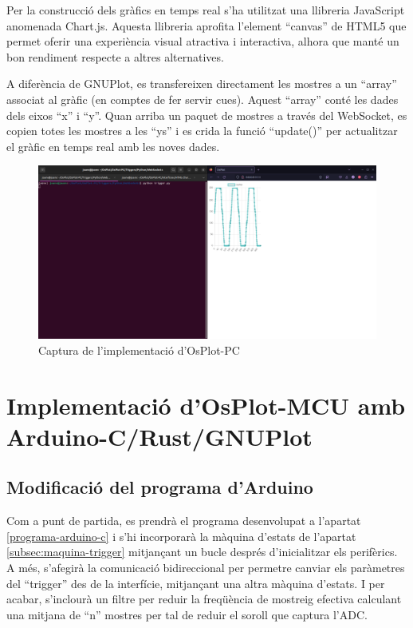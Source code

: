 \documentclass{tfgitic}[2023/06/30]
\begin{document}
Per la construcció dels gràfics en temps real s'ha utilitzat una
llibreria JavaScript anomenada Chart.js. Aquesta llibreria aprofita
l'element ``canvas'' de HTML5 que permet oferir una experiència visual
atractiva i interactiva, alhora que manté un bon rendiment respecte a
altres alternatives.

A diferència de GNUPlot, es transfereixen directament les mostres a un
``array'' associat al gràfic (en comptes de fer servir cues). Aquest
``array'' conté les dades dels eixos ``x'' i ``y''. Quan arriba un
paquet de mostres a través del WebSocket, es copien totes les mostres
a les ``ys'' i es crida la funció ``update()'' per actualitzar el
gràfic en temps real amb les noves dades.

\begin{figure}[h]
  \centering
  \includegraphics[width=\textwidth]{imgs/OsPlot-PC.png}
  \caption{Captura de l'implementació d'OsPlot-PC}
\end{figure}

\chapter{Implementació d'OsPlot-MCU amb Arduino-C/Rust/GNUPlot}

\section{Modificació del programa d'Arduino}

Com a punt de partida, es prendrà el programa desenvolupat a l'apartat
\ref{programa-arduino-c} i s'hi incorporarà la màquina d'estats de
l'apartat \ref{subsec:maquina-trigger} mitjançant un bucle després
d'inicialitzar els perifèrics. A més, s'afegirà la
comunicació bidireccional per permetre canviar els paràmetres del
``trigger'' des de la interfície, mitjançant una altra màquina
d'estats. I per acabar, s'inclourà un filtre per reduir la freqüència
de mostreig efectiva calculant una mitjana de ``n'' mostres per tal de
reduir el soroll que captura l'ADC.
\end{document}
